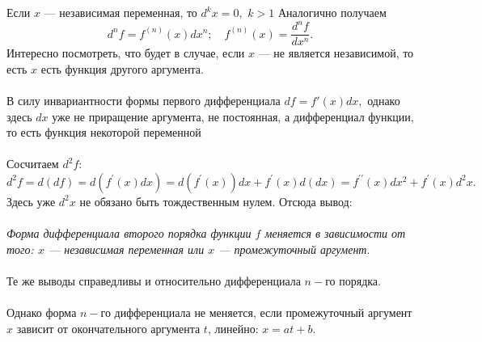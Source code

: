 Если $x$ --- независимая переменная, то $d^k x=0, \, \, k>1$
Аналогично получаем
$$d^n f=f^{(n)}(x) d x^n ; \quad f^{(n)}(x)=\frac{d^n f}{d x^n}.$$
Интересно посмотреть, что будет в случае, если $x$ --- не является независимой, то есть $x$ есть функция другого аргумента.\\\\
В силу инвариантности формы первого дифференциала $df=f'(x)dx,$ однако здесь $dx$ уже не приращение аргумента, не постоянная, а дифференциал функции, то есть функция некоторой переменной\\\\
Сосчитаем $d^2f$:
$$d^2f=d(df)=d(f^\prime(x)dx)=d(f^\prime(x))dx+f^\prime(x)d(dx)=f^{\prime\prime}(x) d x^2+f^\prime(x) d^2 x.$$
Здесь уже $d^2x$ не обязано быть тождественным нулем. Отсюда вывод:\\\\
\textit{Форма дифференциала второго порядка функции $f$ меняется в зависимости от того: $x$ --- независимая переменная или $x$ --- промежуточный аргумент}.\\\\
Те же выводы справедливы и относительно дифференциала $n-$го порядка.\\\\
Однако форма $n-$го дифференциала не меняется, если промежуточный аргумент $x$ зависит от окончательного аргумента $t$, линейно: $x=at+b$.
